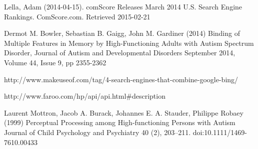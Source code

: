 \documentclass[10pt]{article}
\begin{document}
\begin{thebibliography}{100}
Lella, Adam (2014-04-15). comScore Releases March 2014 U.S. Search Engine Rankings. ComScore.com. Retrieved 2015-02-21

Dermot M. Bowler, Sebastian B. Gaigg, John M. Gardiner (2014) Binding of Multiple Features in Memory by High-Functioning Adults with Autism Spectrum Disorder, Journal of Autism and Developmental Disorders September 2014, Volume 44, Issue 9, pp 2355-2362


 http://www.makeuseof.com/tag/4-search-engines-that-combine-google-bing/


http://www.faroo.com/hp/api/api.html\#description

 Laurent Mottron, Jacob A. Burack, Johannes E. A. Stauder, Philippe Robaey (1999) Perceptual Processing among High-functioning Persons with Autism Journal of Child Psychology and Psychiatry 40 (2), 203–211. doi:10.1111/1469-7610.00433

\end{thebibliography}
\end{document}
